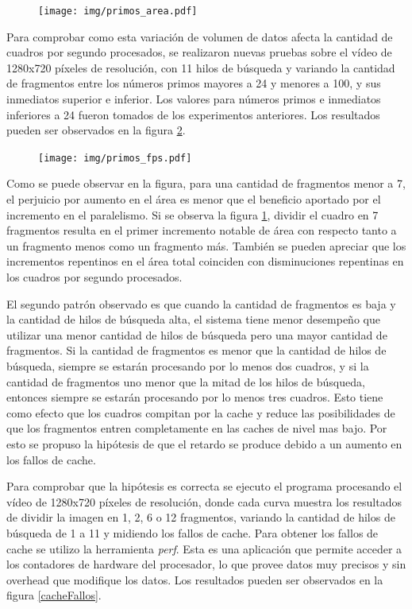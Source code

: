 \begin{figure}[!h]

	\texttt{[image: img/primos\_area.pdf]}
	\caption{}
	\label{primosArea}

\end{figure}

Para comprobar como esta variación de volumen de datos afecta la cantidad de
cuadros por segundo procesados, se realizaron nuevas pruebas sobre el vídeo de
1280x720 píxeles de resolución, con 11 hilos de búsqueda y variando la cantidad
de fragmentos entre los números primos mayores a 24 y menores a 100, y sus
inmediatos superior e inferior. Los valores para números primos e inmediatos
inferiores a 24 fueron tomados de los experimentos anteriores. Los resultados
pueden ser observados en la figura \ref{primosFPS}.

\begin{figure}[!h]

	\texttt{[image: img/primos\_fps.pdf]}
	\caption{}
	\label{primosFPS}

\end{figure}

Como se puede observar en la figura, para una cantidad de fragmentos menor a 7,
el perjuicio por aumento en el área es menor que el beneficio aportado por el
incremento en el paralelismo. Si se observa la figura \ref{primosArea}, dividir
el cuadro en 7 fragmentos resulta en el primer incremento notable de área con
respecto tanto a un fragmento menos como un fragmento más. También se pueden
apreciar que los incrementos repentinos en el área total coinciden con
disminuciones repentinas en los cuadros por segundo procesados.

El segundo patrón observado es que cuando la cantidad de fragmentos es baja y la
cantidad de hilos de búsqueda alta, el sistema tiene menor desempeño que
utilizar una menor cantidad de hilos de búsqueda pero una mayor cantidad de
fragmentos. Si la cantidad de fragmentos es menor que la cantidad de hilos de
búsqueda, siempre se estarán procesando por lo menos dos cuadros, y si la
cantidad de fragmentos uno menor que la mitad de los hilos de búsqueda, entonces
siempre se estarán procesando por lo menos tres cuadros. Esto tiene como efecto
que los cuadros compitan por la cache y reduce las posibilidades de que los
fragmentos entren completamente en las caches de nivel mas bajo. Por esto se
propuso la hipótesis de que el retardo se produce debido a un aumento en los
fallos de cache.

Para comprobar que la hipótesis es correcta se ejecuto el programa procesando el
vídeo de 1280x720 píxeles de resolución, donde cada curva muestra los resultados
de dividir la imagen en 1, 2, 6 o 12 fragmentos, variando la cantidad de hilos
de búsqueda de 1 a 11 y midiendo los fallos de cache. Para obtener los fallos de
cache se utilizo la herramienta \emph{perf}. Esta es una aplicación que permite
acceder a los contadores de hardware del procesador, lo que provee datos muy
precisos y sin overhead que modifique los datos. Los resultados pueden ser
observados en la figura \ref{cacheFallos}.

